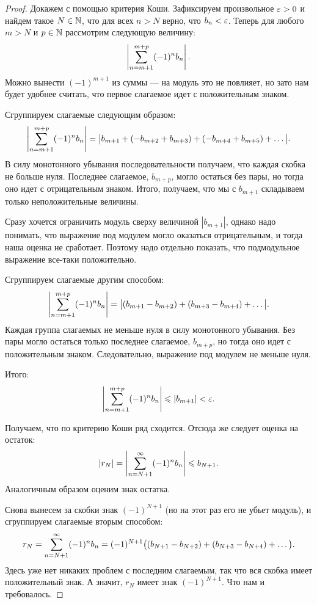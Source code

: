 \documentclass[a4paper, 12pt]{article}
\begin{document}
\begin{proof}
Докажем с помощью критерия Коши. Зафиксируем произвольное $\varepsilon > 0$ и найдем такое $N \in \mathbb{N}$, что для всех $n > N$ верно, что $b_n < \varepsilon$. Теперь для любого $m > N$ и $p \in \mathbb{N}$ рассмотрим следующую величину:
$$
\left| \sum\limits_{n=m+1}^{m+p} (-1)^n b_n \right|.
$$  
Можно вынести $(-1)^{m+1}$ из суммы --- на модуль это не повлияет, но зато нам будет удобнее считать, что первое слагаемое идет с положительным знаком.

Сгруппируем слагаемые следующим образом:
$$
\left| \sum\limits_{n=m+1}^{m+p} (-1)^n b_n \right| = \big|b_{m+1} + (- b_{m+2} + b_{m+3}) + (- b_{m+4} + b_{m+5}) + \ldots\big|.
$$
В силу монотонного убывания последовательности получаем, что каждая скобка не больше нуля. Последнее слагаемое, $b_{m+p}$, могло остаться без пары, но тогда оно идет с отрицательным знаком. Итого, получаем, что мы с $b_{m+1}$ складываем только неположительные величины. 

Сразу хочется ограничить модуль сверху величиной $|b_{m+1}|$, однако надо понимать, что выражение под модулем могло оказаться отрицательным, и тогда наша оценка не сработает. Поэтому надо отдельно показать, что подмодульное выражение все-таки положительно.

Сгруппируем слагаемые другим способом:
$$
\left| \sum\limits_{n=m+1}^{m+p} (-1)^n b_n \right| = \big|(b_{m+1} - b_{m+2}) + (b_{m+3} - b_{m+4}) + \ldots\big|.
$$
Каждая группа слагаемых не меньше нуля в силу монотонного убывания. Без пары могло остаться только последнее слагаемое, $b_{m+p}$, но тогда оно идет с положительным знаком. Следовательно, выражение под модулем не меньше нуля.

Итого:
$$
\left| \sum\limits_{n=m+1}^{m+p} (-1)^n b_n \right| \leqslant |b_{m+1}| < \varepsilon.
$$

Получаем, что по критерию Коши ряд сходится. Отсюда же следует оценка на остаток: 
$$
|r_N| = \left| \sum\limits_{n=N+1}^{\infty}(-1)^n b_n  \right| \leqslant b_{N+1}.
$$
Аналогичным образом оценим знак остатка.

Снова вынесем за скобки знак $(-1)^{N+1}$ (но на этот раз его не убьет модуль), и сгруппируем слагаемые вторым способом:
$$
r_N = \sum\limits_{n=N+1}^{\infty} (-1)^n b_n  = (-1)^{N+1}\big((b_{N+1} - b_{N+2}) + (b_{N+3} - b_{N+4}) + \ldots\big).$$
Здесь уже нет никаких проблем с последним слагаемым, так что вся скобка имеет положительный знак. А значит, $r_N$ имеет знак $(-1)^{N+1}$. Что нам и требовалось.
\end{proof}
\end{document}
